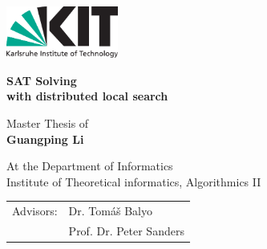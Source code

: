\documentclass[12pt,a4paper,twoside]{scrartcl}
\numberwithin{equation}{section}
\begin{document}
\pagestyle{empty} %

\begin{titlepage}

  \begin{center}\large

    {\flushleft\includegraphics[height=17mm]{kit_logo_en.pdf} \hfill}

    \vfill

    \vspace*{2cm}

    {\bf\huge SAT Solving  \\ with distributed local search \par} 
  

    \vfill
Master Thesis of \\

    \vspace*{15mm}
    {\bf Guangping Li} 

    \vspace*{15mm}

    At the Department of Informatics\\
Institute of Theoretical informatics, Algorithmics II 

    \vspace*{45mm}

    \begin{tabular}{rl}
      Advisors: & Dr. Tom{\' a}{\v s} Balyo \\
      & Prof. Dr. Peter Sanders  \\
    \end{tabular}
    
    \vspace*{10mm}



    \vspace*{12mm}
  \end{center}
\afterpage{\null\newpage}
\end{titlepage}
\afterpage{\null\newpage}
\vspace*{0pt}\vfill
\end{document}
